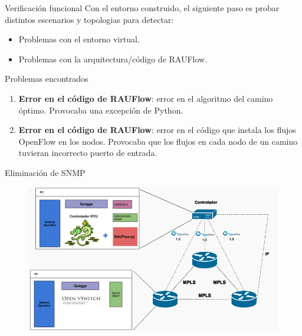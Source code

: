 \documentclass[xcolor=svgnames]{beamer}
\begin{document}
\begin{frame}{Verificación funcional}
	Con el entorno construido, el siguiente paso es probar distintos escenarios y topologias para detectar:
	\begin{itemize}
		\item Problemas con el entorno virtual.
		\item Problemas con la arquitectura/código de RAUFlow.
	\end{itemize}
\end{frame}

\begin{frame}{Problemas encontrados}
	\begin{enumerate}
		\item \textbf{Error en el código de RAUFlow}: error en el algoritmo del camino óptimo. Provocaba una excepción de Python.
		\item \textbf{Error en el código de RAUFlow}: error en el código que instala los flujos OpenFlow en los nodos. Provocaba que los flujos en cada nodo de un camino tuvieran incorrecto puerto de entrada.
	\end{enumerate}
\end{frame}

\begin{frame}{Eliminación de SNMP}
	\begin{figure}[t]
		\centering
		\includegraphics[scale=0.5]{componentes_rauflow}
	\end{figure}
\end{frame}
\end{document}
